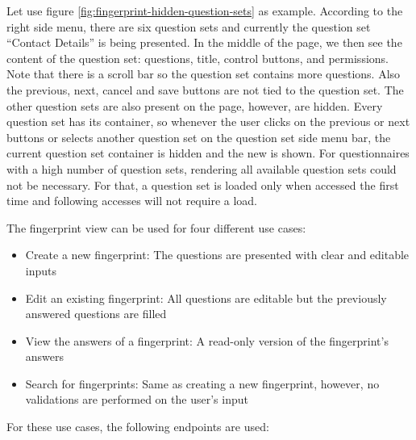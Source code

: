 Let use figure \ref{fig:fingerprint-hidden-question-sets} as example.
According to the right side menu, there are six question sets and currently the question set ``Contact Details'' is being presented.
In the middle of the page, we then see the content of the question set: questions, title, control buttons, and permissions.
Note that there is a scroll bar so the question set contains more questions.
Also the previous, next, cancel and save buttons are not tied to the question set.
The other question sets are also present on the page, however, are hidden.
Every question set has its container, so whenever the user clicks on the previous or next buttons or selects another question set on the question set side menu bar, the current question set container is hidden and the new is shown.
For questionnaires with a high number of question sets, rendering all available question sets could not be necessary.
For that, a question set is loaded only when accessed the first time and following accesses will not require a load.

The fingerprint view can be used for four different use cases:
\begin{itemize}
    \item Create a new fingerprint: The questions are presented with clear and editable inputs
    \item Edit an existing fingerprint: All questions are editable but the previously answered questions are filled
    \item View the answers of a fingerprint: A read-only version of the fingerprint's answers
    \item Search for fingerprints: Same as creating a new fingerprint, however, no validations are performed on the user's input
\end{itemize}

For these use cases, the following endpoints are used:

